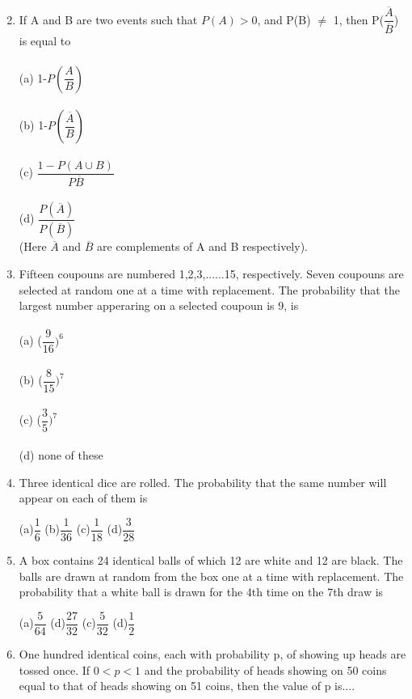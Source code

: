 \documentclass[journal,12pt,twocolumn]{IEEEtran}
\begin{document}
\begin{enumerate}[label=\arabic*]
\begin{itemize}
\begin{multicols}{2}
	\end{multicols}
	\end{itemize}
	\item If A and B are two events such that $P(A)>0$, and P(B) $\neq$ 1, then P($\dfrac{\overline{A}}{\overline{B}}$) is equal to \\
	\\
	(a) 1-$P(\dfrac{A}{B})$\\
	\\
	(b) 1-$P(\dfrac{\overline{A}}{B})$\\
	\\
	(c) $\dfrac{1-P(A \cup B)}{P \overline{B}}$\\
	\\
	(d) $\dfrac{P (\overline{A})}{P( \overline{B})}$\\
	(Here $\overline{A}$  and  $\overline{B}$ are complements of A and B respectively).\\
	\item Fifteen coupouns are numbered 1,2,3,......15, respectively. Seven coupouns are selected at random one at a time with replacement. The probability that the largest number apperaring on a selected coupoun is 9, is\\
	\\
	(a) ($\dfrac{9}{16})^{6}$\\
	\\
	(b) ($\dfrac{8}{15})^{7}$\\
	\\
	(c) ($\dfrac{3}{5})^{7}$\\
	\\
	(d) none of these\\
	\item Three identical dice are rolled. The probability that the same number will appear on each of them is
	\begin{multicols}{4}
	(a)$\dfrac{1}{6}$		(b)$\dfrac{1}{36}$		(c)$\dfrac{1}{18}$		(d)$\dfrac{3}{28}$
	\end{multicols}
	\item A box contains 24 identical balls of which 12 are white and 12 are black. The balls are drawn at random from the box one at a time with replacement. The probability that a white ball is drawn for the 4th time on the 7th draw is 
\begin{multicols}{4}
	(a)$\dfrac{5}{64}$ (d)$\dfrac{27}{32}$ (c)$\dfrac{5}{32}$ (d)$\dfrac{1}{2}$
	\end{multicols}
	\item One hundred identical coins, each with probability p, of showing up heads are tossed once. If $0<p<1$ and the probability of heads showing on 50 coins equal to that of heads showing on 51 coins, then the value of p is....

\end{enumerate}
\end{document}
